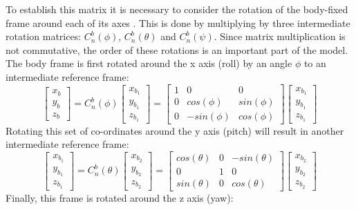 To establish this matrix it is necessary to consider the rotation of the body-fixed frame around each of its axes \cite{Cook2013}. This is done by multiplying by three intermediate rotation matrices: $C^{b}_{n}(\phi)$, $C^{b}_{n}(\theta)$ and $C^{b}_{n}(\psi)$. Since matrix multiplication is not commutative, the order of these rotations is an important part of the model. The body frame is first rotated around the x axis (roll) by an angle $\phi$ to an intermediate reference frame: 
\[
\begin{bmatrix}
x_{b}\\ y_{b}\\ z_{b}
\end{bmatrix} = C^{b}_{n}(\phi)\begin{bmatrix}
x_{b_{1}}\\ y_{b_{1}}\\ z_{b_{1}}
\end{bmatrix}=
\begin{bmatrix}
1 & 0 & 0\\ 
0 & cos(\phi) & sin(\phi)\\ 
0 & -sin(\phi) & cos(\phi)
\end{bmatrix}
\begin{bmatrix}
x_{b_{1}}\\ y_{b_{1}}\\ z_{b_{1}}
\end{bmatrix}
\]
Rotating this set of co-ordinates around the y axis (pitch) will result in another intermediate reference frame:
\[
\begin{bmatrix}
x_{b_{1}}\\ y_{b_{1}}\\ z_{b_{1}}
\end{bmatrix} = C^{b}_{n}(\theta)\begin{bmatrix}
x_{b_{2}}\\ y_{b_{2}}\\ z_{b_{2}}
\end{bmatrix}=
\begin{bmatrix}
cos(\theta) & 0 & -sin(\theta)\\ 
0 & 1 & 0\\ 
sin(\theta) &  0 & cos(\theta)
\end{bmatrix}
\begin{bmatrix}
x_{b_{2}}\\ y_{b_{2}}\\ z_{b_{2}}
\end{bmatrix}
\]
Finally, this frame is rotated around the z axis (yaw):
